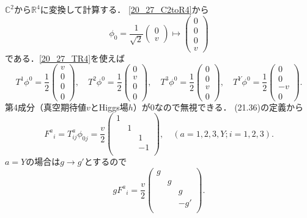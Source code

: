 \(\mathbb{C}^2\)から\(\mathbb{R}^4\)に変換して計算する．
\eqref{20_27_C2toR4}から
\[
\phi_0 = \frac{1}{\sqrt{2}}
\begin{pmatrix}
  0 \\ v
\end{pmatrix}
\mapsto
\begin{pmatrix}
  0 \\ 0 \\ 0 \\ v
\end{pmatrix}
\]
である．\eqref{20_27_TR4}を使えば
\[
T^1\phi^0 = \frac{1}{2}
\begin{pmatrix}
  v \\ 0 \\ 0 \\ 0
\end{pmatrix}
, \quad
T^2\phi^0 = \frac{1}{2}
\begin{pmatrix}
  0 \\ v \\ 0 \\ 0
\end{pmatrix}
, \quad
T^3\phi^0 = \frac{1}{2}
\begin{pmatrix}
  0 \\ 0 \\ v \\ 0
\end{pmatrix}
, \quad
T^Y\phi^0 = \frac{1}{2}
\begin{pmatrix}
  0 \\ 0 \\ -v \\ 0
\end{pmatrix}
.
\]
第4成分（真空期待値\(v\)とHiggs場\(h\)）が\(0\)なので無視できる．
(21.36)の定義から
\[
F^a{}_i = T^a_{ij} \phi_{0j} = \frac{v}{2}
\begin{pmatrix}
  1 & & \\
  & 1 & \\
  & & 1 \\
  & & -1 \\
\end{pmatrix}
, \quad
(a = 1, 2, 3, Y; i = 1, 2, 3) .
\]
\(a=Y\)の場合は\(g \to g'\)とするので
\[
gF^a{}_i = \frac{v}{2}
\begin{pmatrix}
  g & & \\
  & g & \\
  & & g \\
  & & -g' \\
\end{pmatrix}
.
\]


